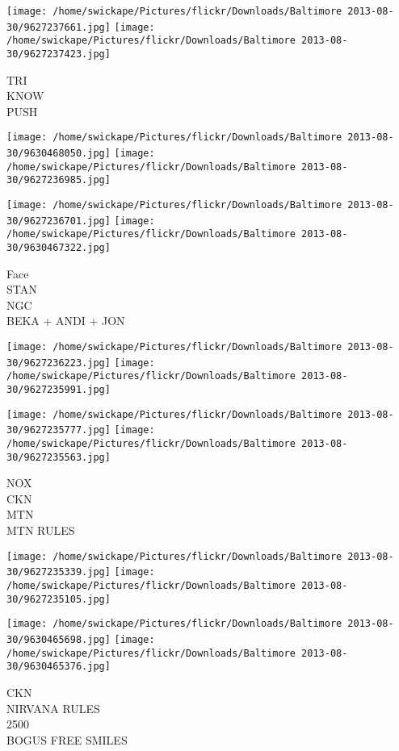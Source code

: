 \documentclass[10pt,letterpaper]{article}
\begin{document}
\vspace{0.25in}
\texttt{[image: /home/swickape/Pictures/flickr/Downloads/Baltimore 2013-08-30/9627237661.jpg]}
\texttt{[image: /home/swickape/Pictures/flickr/Downloads/Baltimore 2013-08-30/9627237423.jpg]}

TRI\\
KNOW\\
PUSH\\
\pagebreak

\texttt{[image: /home/swickape/Pictures/flickr/Downloads/Baltimore 2013-08-30/9630468050.jpg]}
\texttt{[image: /home/swickape/Pictures/flickr/Downloads/Baltimore 2013-08-30/9627236985.jpg]}

\texttt{[image: /home/swickape/Pictures/flickr/Downloads/Baltimore 2013-08-30/9627236701.jpg]}
\texttt{[image: /home/swickape/Pictures/flickr/Downloads/Baltimore 2013-08-30/9630467322.jpg]}

Face\\
STAN\\
NGC\\
BEKA + ANDI + JON\\
\pagebreak

\texttt{[image: /home/swickape/Pictures/flickr/Downloads/Baltimore 2013-08-30/9627236223.jpg]}
\texttt{[image: /home/swickape/Pictures/flickr/Downloads/Baltimore 2013-08-30/9627235991.jpg]}

\texttt{[image: /home/swickape/Pictures/flickr/Downloads/Baltimore 2013-08-30/9627235777.jpg]}
\texttt{[image: /home/swickape/Pictures/flickr/Downloads/Baltimore 2013-08-30/9627235563.jpg]}

NOX\\
CKN\\
MTN\\
MTN RULES\\
\pagebreak

\texttt{[image: /home/swickape/Pictures/flickr/Downloads/Baltimore 2013-08-30/9627235339.jpg]}
\texttt{[image: /home/swickape/Pictures/flickr/Downloads/Baltimore 2013-08-30/9627235105.jpg]}

\texttt{[image: /home/swickape/Pictures/flickr/Downloads/Baltimore 2013-08-30/9630465698.jpg]}
\texttt{[image: /home/swickape/Pictures/flickr/Downloads/Baltimore 2013-08-30/9630465376.jpg]}

CKN\\
NIRVANA RULES\\
2500\\
BOGUS FREE SMILES\\
\pagebreak
\end{document}
